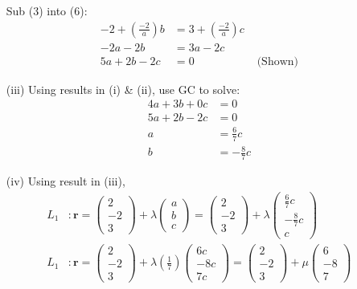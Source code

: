 \begin{enumerate}
Sub (3) into (6): 
\begin{align*}
-2+\left(\frac{-2}{a}\right)b & =3+\left(\frac{-2}{a}\right)c\\
-2a-2b & =3a-2c\\
5a+2b-2c & =0 & \text{ (Shown)}
\end{align*}

\item[(iii)]  Using results in (i) \& (ii), use GC to solve: 
\begin{align*}
4a+3b+0c & =0\\
5a+2b-2c & =0\\
a & =\frac{6}{7}c\\
b & =-\frac{8}{7}c
\end{align*}
\item[(iv)]  Using result in (iii), 
\begin{align*}
L_{1} & :\mathbf{r}=\left(\begin{array}{c}
2\\
-2\\
3
\end{array}\right)+\lambda\left(\begin{array}{c}
a\\
b\\
c
\end{array}\right)=\left(\begin{array}{c}
2\\
-2\\
3
\end{array}\right)+\lambda\left(\begin{array}{c}
\frac{6}{7}c\\
-\frac{8}{7}c\\
c
\end{array}\right)\\
L_{1} & :\mathbf{r}=\left(\begin{array}{c}
2\\
-2\\
3
\end{array}\right)+\lambda\left(\frac{1}{7}\right)\left(\begin{array}{c}
6c\\
-8c\\
7c
\end{array}\right)=\left(\begin{matrix}2\\
-2\\
3
\end{matrix}\right)+\mu\left(\begin{array}{c}
6\\
-8\\
7
\end{array}\right)
\end{align*}


\end{enumerate}
